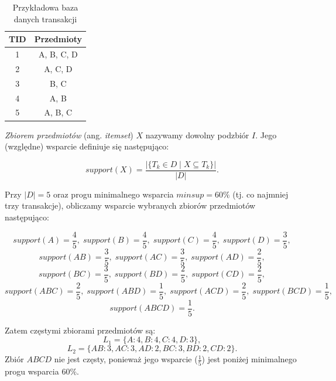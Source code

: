 \begin{table}[ht]
\centering
\caption{Przykładowa baza danych transakcji}
\label{tab:dataset}
\begin{tabularx}{.5\textwidth}{cC}
\toprule
TID & Przedmioty \\
 & A, B, C, D \\
2 & A, C, D \\
3 & B, C \\
4 & A, B \\
5 & A, B, C \\
\bottomrule
\end{tabularx}
\end{table}

\emph{Zbiorem przedmiotów} (ang. \textit{itemset}) $X$ nazywamy dowolny podzbiór $I$. Jego (względne) wsparcie definiuje się następująco:

\begin{equation}
\label{eq:support}
support(X) = \frac{|\{T_k \in D \mid X \subseteq T_k \}|}{|D|}.
\end{equation}

Przy $|D| = 5$ oraz progu minimalnego wsparcia $minsup = 60\%$ (tj. co najmniej trzy transakcje), obliczamy wsparcie wybranych zbiorów przedmiotów następująco:

\begin{equation}\scriptstyle
support(A) = \frac{4}{5},\; support(B) = \frac{4}{5},\; support(C) = \frac{4}{5},\; support(D) = \frac{3}{5},\nonumber
\end{equation}
\begin{equation}\scriptstyle
support(AB) = \frac{3}{5},\; support(AC) = \frac{3}{5},\; support(AD) = \frac{2}{5},\nonumber
\end{equation}
\begin{equation}\scriptstyle
support(BC) = \frac{3}{5},\; support(BD) = \frac{2}{5},\; support(CD) = \frac{2}{5},\nonumber
\end{equation}
\begin{equation}\scriptstyle
support(ABC) = \frac{2}{5},\; support(ABD) = \frac{1}{5},\; support(ACD) = \frac{2}{5},\; support(BCD) = \frac{1}{5},\nonumber
\end{equation}
\begin{equation}\scriptstyle
support(ABCD) = \frac{1}{5}.
\end{equation}

Zatem częstymi zbiorami przedmiotów są:
\begin{equation}
L_1 = \{A:4, B:4, C:4, D:3\},
\end{equation}
\begin{equation}
L_2 = \{AB:3, AC:3, AD:2, BC:3, BD:2, CD:2\}.
\end{equation}
Zbiór $ABCD$ nie jest częsty, ponieważ jego wsparcie ($\frac{1}{5}$) jest poniżej minimalnego progu wsparcia $60\%$.

